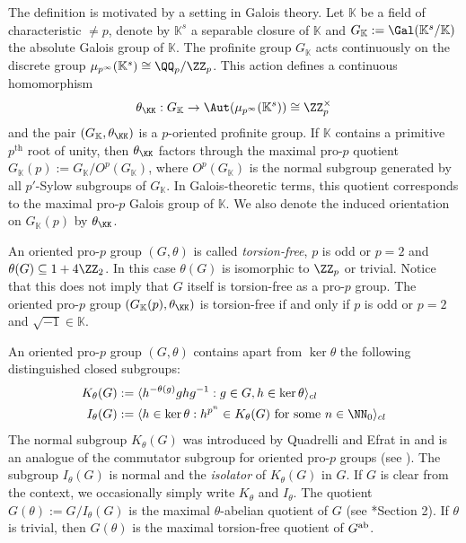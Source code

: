 \documentclass{amsart}
\theoremstyle{definition}
\theoremstyle{remark}
\numberwithin{equation}{section}
\begin{document}
The definition is motivated by a setting in Galois theory. Let $\mathbb{K}$ be a field of characteristic $\neq p$, denote by $\mathbb{K}^s$ a separable closure of $\mathbb{K}$ and $G_\mathbb{K}:=\Gal(\mathbb{K}^s/\mathbb{K})$ the absolute Galois group of $\mathbb{K}$. The profinite group $G_\mathbb{K}$ acts continuously on the discrete group $\smash{\mu_{p^\infty}(\mathbb{K}^s)}\cong \QQ_p/\ZZ_p$. This action defines a continuous homomorphism 
\begin{align}
\theta_{\KK}:G_{\mathbb{K}}\to \Aut(\mu_{p^\infty}(\mathbb{K}^s))\cong \ZZ_p^\times
\end{align}
and the pair $(G_\mathbb{K},\theta_{\KK})$ is a $p$-oriented profinite group. If $\mathbb{K}$ contains a primitive $p^{\text{th}}$ root of unity, then $\theta_{\KK}$ factors through the maximal pro-$p$ quotient $G_\mathbb{K}(p):=G_\mathbb{K}/O^p(G_\mathbb{K})$, where $O^p(G_\mathbb{K})$ is the normal subgroup generated by all $p'$-Sylow subgroups of $G_\mathbb{K}$. In Galois-theoretic terms, this quotient corresponds to the maximal pro-$p$ Galois group of $\mathbb{K}$. We also denote the induced orientation on $G_\mathbb{K}(p)$ by $\theta_{\KK}$.

An oriented pro-$p$ group $(G,\theta)$ is called \emph{torsion-free}, $p$ is odd or $p=2$ and $\theta(G)\subseteq 1+4\ZZ_2$. In this case $\theta(G)$ is isomorphic to $\ZZ_p$ or trivial. Notice that this does not imply that $G$ itself is torsion-free as a pro-$p$ group. The oriented pro-$p$ group $(G_\mathbb{K}(p),\theta_{\KK})$ is torsion-free if and only if $p$ is odd or $p=2$ and $\sqrt{-1}\in \mathbb{K}$.

An oriented pro-$p$ group $(G,\theta)$ contains apart from $\ker \theta$ the following distinguished closed subgroups:
\begin{align*}
    K_\theta(G)&:=\langle h^{-\theta(g)}ghg^{-1}:g\in G, h\in \ker \theta\rangle_{cl}\\
    I_\theta(G)&:=\langle h\in \ker \theta:h^{p^n}\in K_\theta(G)\text{ for some }n\in \NN_0\rangle_{cl}
\end{align*}
The normal subgroup $K_\theta(G)$ was introduced by Quadrelli and Efrat in \cite{EfratQuadrelli2019} and is an analogue of the commutator subgroup for oriented pro-$p$ groups (see \cite{QuadrelliWeigel2022}). The subgroup $I_\theta(G)$ is normal and the \emph{isolator} of $K_\theta(G)$ in $G$. If $G$ is clear from the context, we occasionally simply write $K_\theta$ and $I_\theta$. The quotient $G(\theta):=G/I_\theta(G)$ is the maximal $\theta$-abelian quotient of $G$ (see \cite{QuadrelliWeigel2022}*{Section 2}). If $\theta$ is trivial, then $G(\theta)$ is the maximal torsion-free quotient of $G^{\rm ab}$. 
\end{document}
